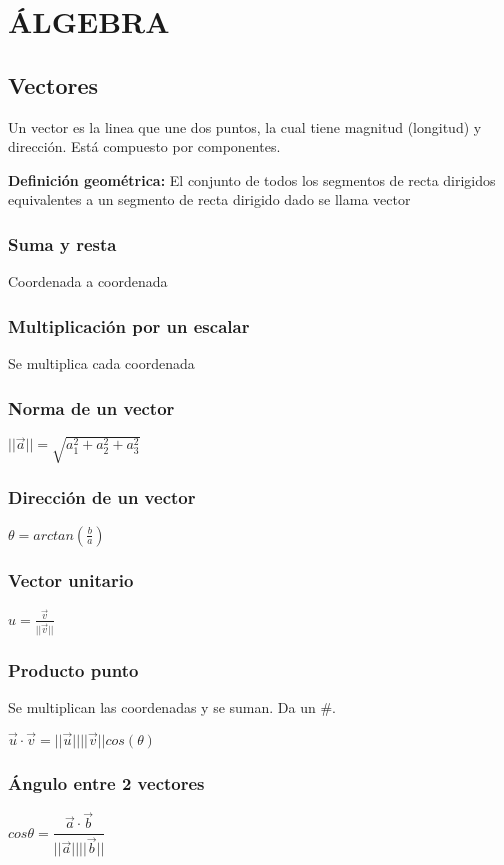 \section{ÁLGEBRA}

\subsection{Vectores}
Un vector es la linea que une dos puntos, la cual tiene magnitud (longitud) y dirección. Está compuesto por componentes.

\textbf{Definición geométrica:} El conjunto de todos los segmentos de recta dirigidos equivalentes a un segmento de
recta dirigido dado se llama vector
\subsubsection{Suma y resta}
Coordenada a coordenada
\subsubsection{Multiplicación por un escalar}
Se multiplica cada coordenada

\subsubsection{Norma de un vector}
$||\overrightarrow{a}||=\sqrt{a_1^2+a_2^2+a_3^2}$

\subsubsection{Dirección de un vector}
$\theta=arctan(\frac{b}{a})$

\subsubsection{Vector unitario}
$u=\frac{\overrightarrow{v}}{||\overrightarrow{v}||}$

\subsubsection{Producto punto}
Se multiplican las coordenadas y se suman. Da un $\#$.

$\overrightarrow{u}\cdot\overrightarrow{v}=||\overrightarrow{u}||||\overrightarrow{v}||cos(\theta)$

\subsubsection{Ángulo entre 2 vectores}
$cos\theta=\dfrac{\overrightarrow{a}\cdot \overrightarrow{b}}{||\overrightarrow{a}||||\overrightarrow{b}||}$

